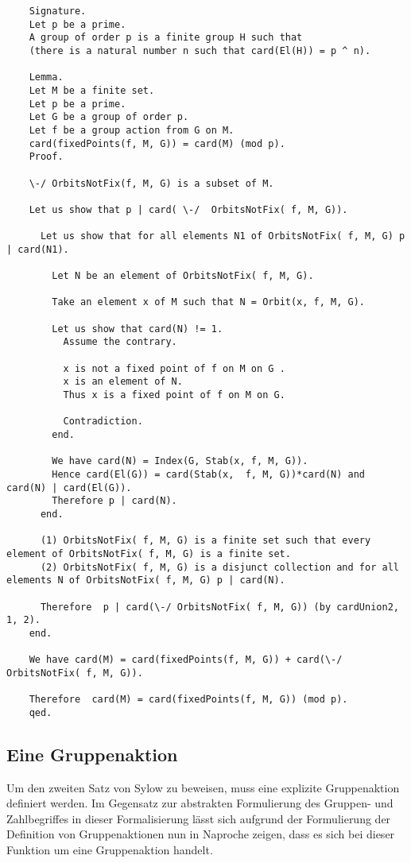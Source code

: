 \documentclass[a4paper,12pt]{scrartcl}
\begin{document}
\begin{lstlisting}
	Signature.
	Let p be a prime.
	A group of order p is a finite group H such that
	(there is a natural number n such that card(El(H)) = p ^ n).
	
	Lemma.
	Let M be a finite set.
	Let p be a prime.
	Let G be a group of order p.
	Let f be a group action from G on M.
	card(fixedPoints(f, M, G)) = card(M) (mod p).
	Proof.
	
	\-/ OrbitsNotFix(f, M, G) is a subset of M.
	
	Let us show that p | card( \-/  OrbitsNotFix( f, M, G)).
	
	  Let us show that for all elements N1 of OrbitsNotFix( f, M, G) p | card(N1).
	
		Let N be an element of OrbitsNotFix( f, M, G).
	
		Take an element x of M such that N = Orbit(x, f, M, G).
		
		Let us show that card(N) != 1.
		  Assume the contrary.
		   
		  x is not a fixed point of f on M on G .
		  x is an element of N.
		  Thus x is a fixed point of f on M on G.
	
		  Contradiction.
		end.
	
		We have card(N) = Index(G, Stab(x, f, M, G)).
		Hence card(El(G)) = card(Stab(x,  f, M, G))*card(N) and card(N) | card(El(G)).
		Therefore p | card(N).
	  end.
	
	  (1) OrbitsNotFix( f, M, G) is a finite set such that every element of OrbitsNotFix( f, M, G) is a finite set.
	  (2) OrbitsNotFix( f, M, G) is a disjunct collection and for all elements N of OrbitsNotFix( f, M, G) p | card(N).
	
	  Therefore  p | card(\-/ OrbitsNotFix( f, M, G)) (by cardUnion2, 1, 2).
	end.
	
	We have card(M) = card(fixedPoints(f, M, G)) + card(\-/ OrbitsNotFix( f, M, G)).
	
	Therefore  card(M) = card(fixedPoints(f, M, G)) (mod p).
	qed.

\end{lstlisting}

\subsection{Eine Gruppenaktion}

Um den zweiten Satz von Sylow zu beweisen, muss eine explizite Gruppenaktion definiert werden. Im Gegensatz zur abstrakten Formulierung des Gruppen- und Zahlbegriffes in dieser Formalisierung lässt sich aufgrund der Formulierung der Definition von Gruppenaktionen nun in Naproche zeigen, dass es sich bei dieser Funktion um eine Gruppenaktion handelt.
\end{document}

